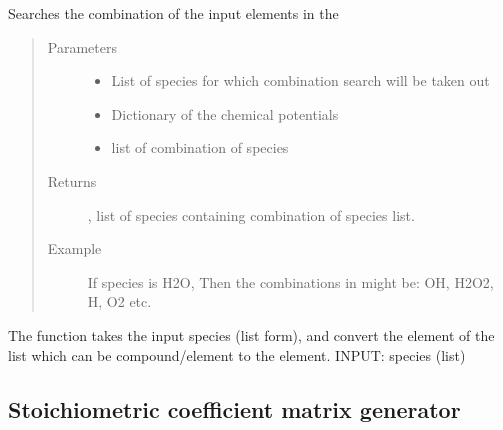 \documentclass[letterpaper,10pt,english]{sphinxmanual}
\begin{document}
\begin{fulllineitems}
Searches the combination of the input elements in the 
\begin{quote}\begin{description}
\item[{Parameters}] \leavevmode\begin{itemize}
\item {} 
 \textendash{} List of species for which combination search will be taken out

\item {} 
 \textendash{} Dictionary of the chemical potentials

\item {} 
 \textendash{} list of combination of species

\end{itemize}

\item[{Returns}] \leavevmode
{}, list of species containing combination of species list.

\item[{Example}] \leavevmode
If species is H2O,
Then the combinations in  might be: OH, H2O2, H, O2 etc.

\end{description}\end{quote}

\end{fulllineitems}



\begin{fulllineitems}
The function takes the input species (list form), and convert
the element of the list which can be compound/element to the element.
INPUT: species (list)

\end{fulllineitems}



\subsection{Stoichiometric coefficient matrix generator}
\label{\detokenize{code_structure:stoichiometric-coefficient-matrix-generator}}
\end{document}
